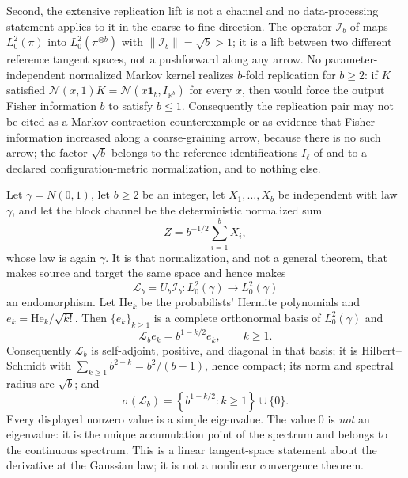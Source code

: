 Second, the extensive replication lift is not a channel and no data-processing
statement applies to it in the coarse-to-fine direction.  The operator
\(\mathscr I_b\) of  maps \(L^2_0(\pi)\) into
\(L^2_0(\pi^{\otimes b})\) with \(\lVert\mathscr I_b\rVert=\sqrt b>1\); it is a
lift between two different reference tangent spaces, not a pushforward along
any arrow.  No parameter-independent normalized Markov kernel realizes
\(b\)-fold replication for \(b\geq2\): if \(K\) satisfied
\(\mathcal N(x,1)K=\mathcal N(x\mathbf 1_b,I_{\mathbb R^b})\) for every \(x\), then
 would force the output Fisher
information \(b\) to satisfy \(b\leq1\).  Consequently the replication pair may
not be cited as a Markov-contraction counterexample or as evidence that Fisher
information increased along a coarse-graining arrow, because there is no such
arrow; the factor \(\sqrt b\) belongs to the reference identifications
\(I_\ell\) of  and to a declared
configuration-metric normalization, and to nothing else.

Let \(\gamma=N(0,1)\), let \(b\geq2\) be an integer, let \(X_1,\dots,X_b\) be
independent with law \(\gamma\), and let the block channel be the deterministic
normalized sum
\begin{equation}
 Z=b^{-1/2}\sum_{i=1}^bX_i,
 \label{eq:rg-gaussian-block-statistic}
\end{equation}
whose law is again \(\gamma\).  It is that normalization, and not a general
theorem, that makes source and target the same space and hence makes
\begin{equation}
 \mathscr L_b=U_b\mathscr I_b:L^2_0(\gamma)\longrightarrow L^2_0(\gamma)
 \label{eq:rg-gaussian-score-operator}
\end{equation}
an endomorphism.  Let \(\mathrm{He}_k\) be the probabilists' Hermite
polynomials and \(e_k=\mathrm{He}_k/\sqrt{k!}\).  Then \(\{e_k\}_{k\geq1}\) is a
complete orthonormal basis of \(L^2_0(\gamma)\) and
\begin{equation}
 \mathscr L_be_k=b^{1-k/2}e_k,
 \qquad k\geq1.
 \label{eq:rg-hermite-eigenvalues}
\end{equation}
Consequently \(\mathscr L_b\) is self-adjoint, positive, and diagonal in that
basis; it is Hilbert--Schmidt with
\(\sum_{k\geq1}b^{2-k}=b^2/(b-1)\), hence compact; its norm and spectral radius
are \(\sqrt b\); and
\begin{equation}
 \sigma(\mathscr L_b)
 =\left\{b^{1-k/2}:k\geq1\right\}\cup\{0\}.
 \label{eq:rg-hermite-spectrum}
\end{equation}
Every displayed nonzero value is a simple eigenvalue.  The value \(0\) is
\emph{not} an eigenvalue: it is the unique accumulation point of the spectrum
and belongs to the continuous spectrum.  This is a linear tangent-space
statement about the derivative at the Gaussian law; it is not a nonlinear
convergence theorem. 

